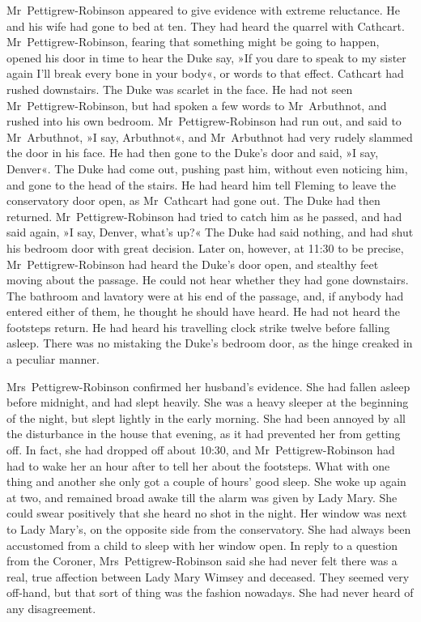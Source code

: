 Mr~Pettigrew-Robinson appeared to give evidence with extreme reluctance. He and his wife had gone to bed at ten. They had heard the quarrel with Cathcart. Mr~Pettigrew-Robinson, fearing that something might be going to happen, opened his door in time to hear the Duke say, »If you dare to speak to my sister again I'll break every bone in your body«, or words to that effect. Cathcart had rushed downstairs. The Duke was scarlet in the face. He had not seen Mr~Pettigrew-Robinson, but had spoken a few words to Mr~Arbuthnot, and rushed into his own bedroom. Mr~Pettigrew-Robinson had run out, and said to Mr~Arbuthnot, »I say, Arbuthnot«, and Mr~Arbuthnot had very rudely slammed the door in his face. He had then gone to the Duke's door and said, »I say, Denver«. The Duke had come out, pushing past him, without even noticing him, and gone to the head of the stairs. He had heard him tell Fleming to leave the conservatory door open, as Mr~Cathcart had gone out. The Duke had then returned. Mr~Pettigrew-Robinson had tried to catch him as he passed, and had said again, »I say, Denver, what's up?« The Duke had said nothing, and had shut his bedroom door with great decision. Later on, however, at 11:30 to be precise, Mr~Pettigrew-Robinson had heard the Duke's door open, and stealthy feet moving about the passage. He could not hear whether they had gone downstairs. The bathroom and lavatory were at his end of the passage, and, if anybody had entered either of them, he thought he should have heard. He had not heard the footsteps return. He had heard his travelling clock strike twelve before falling asleep. There was no mistaking the Duke's bedroom door, as the hinge creaked in a peculiar manner.

Mrs~Pettigrew-Robinson confirmed her husband's evidence. She had fallen asleep before midnight, and had slept heavily. She was a heavy sleeper at the beginning of the night, but slept lightly in the early morning. She had been annoyed by all the disturbance in the house that evening, as it had prevented her from getting off. In fact, she had dropped off about 10:30, and Mr~Pettigrew-Robinson had had to wake her an hour after to tell her about the footsteps. What with one thing and another she only got a couple of hours' good sleep. She woke up again at two, and remained broad awake till the alarm was given by Lady Mary. She could swear positively that she heard no shot in the night. Her window was next to Lady Mary's, on the opposite side from the conservatory. She had always been accustomed from a child to sleep with her window open. In reply to a question from the Coroner, Mrs~Pettigrew-Robinson said she had never felt there was a real, true affection between Lady Mary Wimsey and deceased. They seemed very off-hand, but that sort of thing was the fashion nowadays. She had never heard of any disagreement.

